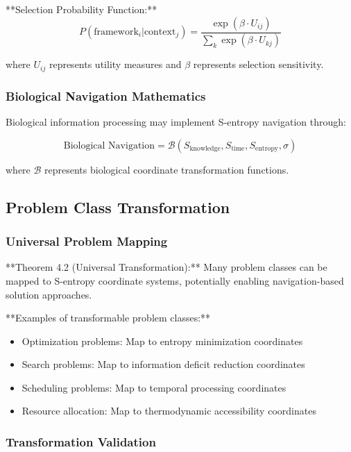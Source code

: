 \documentclass[12pt,a4paper]{article}
\begin{document}
**Selection Probability Function:**
\begin{equation}
P(\text{framework}_i | \text{context}_j) = \frac{\exp(\beta \cdot U_{ij})}{\sum_k \exp(\beta \cdot U_{kj})}
\label{eq:framework_selection}
\end{equation}

where $U_{ij}$ represents utility measures and $\beta$ represents selection sensitivity.

\subsubsection{Biological Navigation Mathematics}

Biological information processing may implement S-entropy navigation through:

\begin{equation}
\text{Biological Navigation} = \mathcal{B}(S_{\text{knowledge}}, S_{\text{time}}, S_{\text{entropy}}, \sigma)
\label{eq:biological_navigation}
\end{equation}

where $\mathcal{B}$ represents biological coordinate transformation functions.

\subsection{Problem Class Transformation}

\subsubsection{Universal Problem Mapping}

**Theorem 4.2 (Universal Transformation):** Many problem classes can be mapped to S-entropy coordinate systems, potentially enabling navigation-based solution approaches.

**Examples of transformable problem classes:**
\begin{itemize}
\item Optimization problems: Map to entropy minimization coordinates
\item Search problems: Map to information deficit reduction coordinates
\item Scheduling problems: Map to temporal processing coordinates
\item Resource allocation: Map to thermodynamic accessibility coordinates
\end{itemize}

\subsubsection{Transformation Validation}
\end{document}
